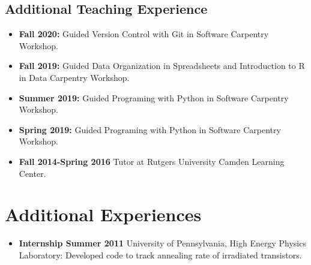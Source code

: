 \subsection*{Additional Teaching Experience}
\begin{itemize}
	\item \textbf{Fall 2020:} Guided Version Control with Git in Software Carpentry Workshop.
	\vspace{2pt}
	\item \textbf{Fall 2019:} Guided Data Organization in Spreadsheets and Introduction to R in Data Carpentry Workshop.
	\vspace{2pt}
	\item \textbf{Summer 2019:} Guided Programing with Python in Software Carpentry Workshop.
	\vspace{2pt}
	\item \textbf{Spring 2019:} Guided Programing with Python in Software Carpentry Workshop.
	\vspace{2pt}
	\item \textbf{Fall 2014-Spring 2016} Tutor at Rutgers University Camden Learning Center.
	\vspace{2pt}
\end{itemize}
\section*{Additional Experiences}
\begin{itemize}
	\item \textbf{Internship Summer 2011} University of Pennsylvania, High Energy Physics Laboratory: Developed code to track annealing rate of irradiated transistors.
\end{itemize}
\vspace{4pt}
